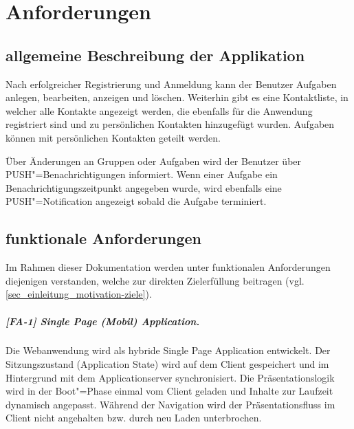 \chapter{Anforderungen}
\label{chp_anforderungen}

\section{allgemeine Beschreibung der Applikation}
\label{sec_anfroderungen_allgemeine-beschreibung}

Nach erfolgreicher Registrierung und Anmeldung kann der Benutzer Aufgaben anlegen, bearbeiten, anzeigen und löschen. Weiterhin gibt es eine Kontaktliste, in welcher alle Kontakte angezeigt werden, die ebenfalls für die Anwendung registriert sind und zu persönlichen Kontakten hinzugefügt wurden. Aufgaben können mit persönlichen Kontakten geteilt werden. 

Über Änderungen an Gruppen oder Aufgaben wird der Benutzer über PUSH"=Benachrichtigungen informiert. Wenn einer Aufgabe ein Benachrichtigungszeitpunkt angegeben wurde, wird ebenfalls eine PUSH"=Notification angezeigt sobald die Aufgabe terminiert.


\newpage
\section{funktionale Anforderungen}
\label{sec_anforderungen_funktionale-anforderungen}

Im Rahmen dieser Dokumentation werden unter funktionalen Anforderungen diejenigen verstanden, welche zur direkten Zielerfüllung beitragen (vgl. \ref{sec_einleitung_motivation-ziele}).


\paragraph{[FA-1] Single Page (Mobil) Application.} Die Webanwendung wird als hybride Single Page Application entwickelt. Der Sitzungszustand (\glqq Application State\grqq) wird auf dem Client gespeichert und im Hintergrund mit dem Applicationserver synchronisiert. Die Präsentationslogik wird in der \glqq Boot"=Phase\grqq{} einmal vom Client geladen und Inhalte zur Laufzeit dynamisch angepasst. Während der Navigation wird der Präsentationsfluss im Client nicht angehalten bzw. durch \glqq neu Laden\grqq{} unterbrochen.


